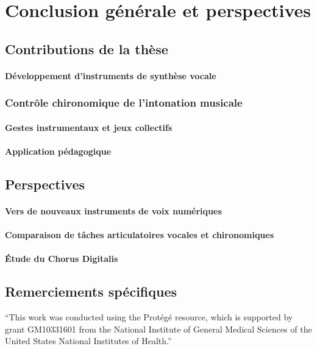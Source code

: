 

\chapter*{Conclusion générale et perspectives}
\mtcaddchapter

\mtcaddpart




\section*{Contributions de la thèse}

\subsubsection*{Développement d'instruments de synthèse vocale}

\lipsum[1-2]


\subsection*{Contrôle chironomique de l'intonation musicale}
\lipsum[1-2]

\subsubsection*{Gestes instrumentaux et jeux collectifs}
\lipsum[1-2]

\subsubsection*{Application pédagogique}
\lipsum[1-2]

\section*{Perspectives}

\subsubsection*{Vers de nouveaux instruments de voix numériques}
\lipsum[1-2]

\subsubsection*{Comparaison de tâches articulatoires vocales et chironomiques}
\lipsum[1-2]

\subsubsection*{Étude du Chorus Digitalis}
\lipsum[1-2]

\section*{Remerciements spécifiques}

“This work was conducted using the Protégé resource, which is supported by grant GM10331601 from the National Institute of General Medical Sciences of the United States National Institutes of Health.” 